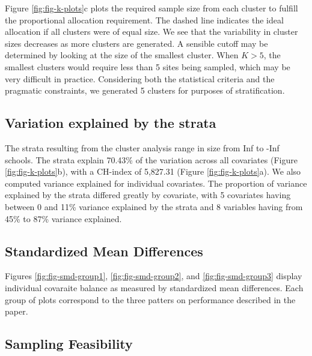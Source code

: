 \documentclass[
  english,
  man,floatsintext]{apa6}
\begin{document}
Figure \ref{fig:fig-k-plots}c plots the required sample size from each cluster to fulfill the proportional allocation requirement. The dashed line indicates the ideal allocation if all clusters were of equal size. We see that the variability in cluster sizes decreases as more clusters are generated. A sensible cutoff may be determined by looking at the size of the smallest cluster. When \(K > 5\), the smallest clusters would require less than 5 sites being sampled, which may be very difficult in practice. Considering both the statistical criteria and the pragmatic constraints, we generated 5 clusters for purposes of stratification.

\hypertarget{variation-explained-by-the-strata}{%
\subsection{Variation explained by the strata}\label{variation-explained-by-the-strata}}

The strata resulting from the cluster analysis range in size from Inf to -Inf schools. The strata explain 70.43\% of the variation across all covariates (Figure \ref{fig:fig-k-plots}b), with a CH-index of 5,827.31 (Figure \ref{fig:fig-k-plots}a). We also computed variance explained for individual covariates. The proportion of variance explained by the strata differed greatly by covariate, with 5 covariates having between 0 and 11\% variance explained by the strata and 8 variables having from 45\% to 87\% variance explained.

\hypertarget{standardized-mean-differences-1}{%
\subsection{Standardized Mean Differences}\label{standardized-mean-differences-1}}

Figures \ref{fig:fig-smd-group1}, \ref{fig:fig-smd-group2}, and \ref{fig:fig-smd-group3} display individual covaraite balance as measured by standardized mean differences. Each group of plots correspond to the three patters on performance described in the paper.







\newpage

\hypertarget{sampling-feasibility}{%
\subsection{Sampling Feasibility}\label{sampling-feasibility}}
\end{document}
